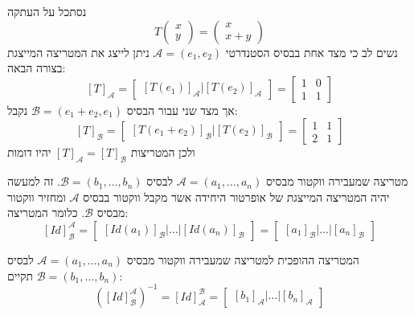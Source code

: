 \documentclass{tstextbook}
\begin{document}
\begin{example}
נסתכל על העתקה
$$T\begin{pmatrix}x\\ y\end{pmatrix}=\begin{pmatrix}x\\ x+y
\end{pmatrix}$$
נשים לב כי מצד אחת בבסיס הסטנדרטי \(\mathcal{A}=(e_{1},e_{2})\) ניתן לייצג את המטריצה המייצגת בצורה הבאה:
$$[T]_{\mathcal{A} }=\begin{bmatrix}[T(e_{1})]_{\mathcal{A}}  \bigg|[T(e_{2})]_{\mathcal{A} } \end{bmatrix}=\begin{bmatrix}1  &  0 \\1 & 1
\end{bmatrix}$$
אך מצד שני עבור הבסיס \(\mathcal{B}=(e_{1}+e_{2},e_{1})\) נקבל:
$$[T]_{\mathcal{B} }=\begin{bmatrix}[T(e_{1}+e_{2})]_{\mathcal{B}}  \bigg|[T(e_{2})]_{\mathcal{B} } \end{bmatrix}=\begin{bmatrix}1  &  1 \\2 & 1
\end{bmatrix}$$
ולכן המטריצות \([T]_{\mathcal{A}}=[T]_{\mathcal{B}}\) יהיו דומות

\end{example}
\begin{definition}
מטריצה שמעבירה ווקטור מבסיס \(\mathcal{A}=\left( a_{1},\dots,a_{n} \right)\) לבסיס \(\mathcal{B}=\left( b_{1},\dots,b_{n} \right)\). זה למעשה יהיה המטריצה המייצגת של אופרטור היחידה אשר מקבל ווקטור בבסיס \(\mathcal{A}\) ומחזיר ווקטור מבסיס \(\mathcal{B}\). כלומר המטריצה:
$$[Id]_{\mathcal{B} }^{\mathcal{A} }=\begin{bmatrix}[Id(a_{1})]_{\mathcal{B} } \bigg| \dots \bigg| [Id(a_{n})]_{\mathcal{B} }\end{bmatrix}=\begin{bmatrix}[a_{1}]_{\mathcal{B} } \bigg| \dots \bigg| [a_{n}]_{\mathcal{B} }
\end{bmatrix}$$

\end{definition}
\begin{proposition}
המטריצה ההופכית למטריצה שמעבירה ווקטור מבסיס \(\mathcal{A}=\left( a_{1},\dots,a_{n} \right)\) לבסיס \(\mathcal{B}=\left( b_{1},\dots,b_{n} \right)\) תקיים:
$$\left( [Id]_{\mathcal{B} }^{\mathcal{A} } \right)^{-1}=[Id]_{\mathcal{A} }^{\mathcal{B} }=\begin{bmatrix}[b_{1}]_{\mathcal{A} } \bigg| \dots \bigg| [b_{n}]_{\mathcal{A} }
\end{bmatrix}$$

\end{proposition}
\end{document}
